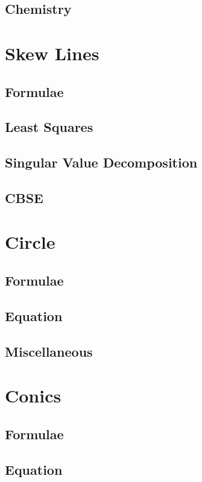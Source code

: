 \documentclass[journal]{IEEEtran}
\begin{document}
\subsection{Chemistry}

\newpage
\section{Skew Lines}
\subsection{Formulae}

\subsection{Least Squares}

\subsection{Singular Value Decomposition}

\subsection{CBSE}

\newpage
\section{Circle}
\subsection{Formulae}

\subsection{Equation}

\subsection{Miscellaneous}

\newpage
\section{Conics}
\subsection{Formulae}

\subsection{Equation}

\end{document}
